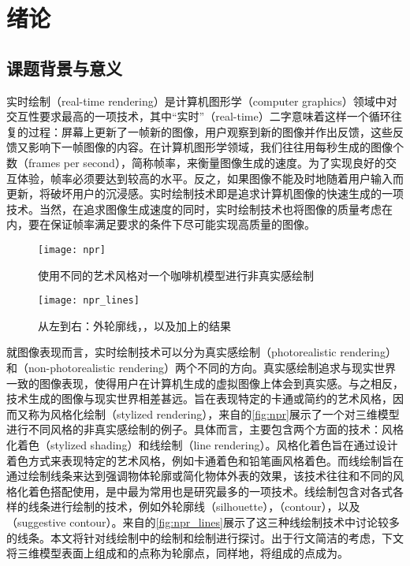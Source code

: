 \chapter{绪论}

\section{课题背景与意义}

实时绘制（real-time rendering）是计算机图形学（computer graphics）领域中对交互性要求最高的一项技术，其中“实时”（real-time）二字意味着这样一个循环往复的过程：屏幕上更新了一帧新的图像，用户观察到新的图像并作出反馈，这些反馈又影响下一帧图像的内容。在计算机图形学领域，我们往往用每秒生成的图像个数（frames per second），简称帧率，来衡量图像生成的速度。为了实现良好的交互体验，帧率必须要达到较高的水平。反之，如果图像不能及时地随着用户输入而更新，将破坏用户的沉浸感。实时绘制技术即是追求计算机图像的快速生成的一项技术。当然，在追求图像生成速度的同时，实时绘制技术也将图像的质量考虑在内，要在保证帧率满足要求的条件下尽可能实现高质量的图像。

\begin{figure}[!t]
    \centering
    \texttt{[image: npr]}
    \caption{\label{fig:npr}
    使用不同的艺术风格对一个咖啡机模型进行非真实感绘制}
\end{figure}

\begin{figure}[!b]
    \centering
    \texttt{[image: npr\_lines]}
    \caption{\label{fig:npr_lines}
    从左到右：外轮廓线，\con{}，以及\con{}加上\scon{}的结果}
\end{figure}

就图像表现而言，实时绘制技术可以分为真实感绘制（photorealistic rendering）和\npr{}（non-photorealistic rendering）两个不同的方向。真实感绘制追求与现实世界一致的图像表现，使得用户在计算机生成的虚拟图像上体会到真实感。与之相反，\npr{}技术生成的图像与现实世界相差甚远。\npr{}旨在表现特定的卡通或简约的艺术风格，因而又称为风格化绘制（stylized rendering），来自\cite{akenine2018real}的\autoref{fig:npr}展示了一个对三维模型进行不同风格的非真实感绘制的例子。具体而言，\npr{}主要包含两个方面的技术：风格化着色（stylized shading）和线绘制（line rendering）。风格化着色旨在通过设计着色方式来表现特定的艺术风格，例如卡通着色和铅笔画风格着色。而线绘制旨在通过绘制线条来达到强调物体轮廓或简化物体外表的效果，该技术往往和不同的风格化着色搭配使用，是\npr{}中最为常用也是研究最多的一项技术。线绘制包含对各式各样的线条进行绘制的技术，例如外轮廓线（silhouette），\con{}（contour），以及\scon{}（suggestive contour）。来自\cite{akenine2018real}的\autoref{fig:npr_lines}展示了这三种线绘制技术中讨论较多的线条。本文将针对线绘制中的\con{}绘制和\scon{}绘制进行探讨。出于行文简洁的考虑，下文将三维模型表面上组成\con{}和\scon{}的点称为轮廓点，同样地，将组成\vdl{}的点成为\vdp{}。

